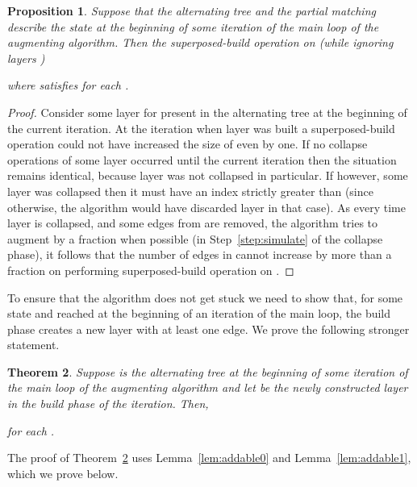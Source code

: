 \documentclass[11pt]{article}
\newtheorem{theorem}{Theorem}[section]
\newtheorem{proposition}[theorem]{Proposition}
\theoremstyle{definition}
\theoremstyle{remark}
\begin{document}
\begin{proposition}\label{lem:noaugment}
  Suppose that the alternating tree  and the
  partial matching  describe the state at the beginning of some
  iteration of the main loop of the augmenting algorithm.  Then the
  superposed-build operation on  (while ignoring layers
  )
  
  where  satisfies  for each
  .
\end{proposition}

\begin{proof}
  Consider some layer  for  present in the
  alternating tree at the beginning of the current iteration. At the
  iteration when layer  was built a superposed-build operation
  could not have increased the size of  even by one. If no
  collapse operations of some layer occurred until the current
  iteration then the situation remains identical, because layer
   was not collapsed in particular. If however, some layer
  was collapsed then it must have an index strictly greater than 
  (since otherwise, the algorithm would have discarded layer  in
  that case). As every time layer  is collapsed, and some
  edges from  are removed, the algorithm tries to augment 
  by a  fraction when possible (in Step~\ref{step:simulate} of
  the collapse phase), it follows that the number of edges in 
  cannot increase by more than a  fraction on performing
  superposed-build operation on .
\end{proof}



To ensure that the algorithm does not get stuck we need to show that, for some state  and  reached at the beginning of an iteration of the main loop, the build phase creates a new layer  with at least one edge. We prove the following stronger statement.

\begin{theorem}\label{lem:addable}
  Suppose  is the alternating tree at the beginning of some iteration of the main loop of the augmenting algorithm and let  be the newly constructed layer in the build phase of the iteration. Then,
  
  for each .
\end{theorem}

The proof of Theorem~\ref{lem:addable} uses Lemma~\ref{lem:addable0} and Lemma~\ref{lem:addable1}, which we prove below.
\end{document}
